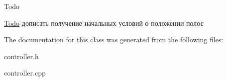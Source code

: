 \begin{DoxyRefDesc}{Todo}
\item[\hyperlink{todo__todo000003}{Todo}]дописать получение начальных условий о положении полос \end{DoxyRefDesc}


The documentation for this class was generated from the following files\+:\begin{DoxyCompactItemize}
\item 
controller.\+h\item 
controller.\+cpp\end{DoxyCompactItemize}
